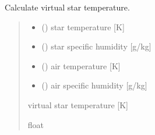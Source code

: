 \documentclass[letterpaper,10pt,english]{sphinxmanual}
\begin{document}

\begin{fulllineitems}
\label{\detokenize{users_guide:AirSeaFluxCode.flux_subs.get_tsrv}}
\pysigstartsignatures
\pysiglinewithargsret
{}
{\sphinxparamcomma {}\sphinxparamcomma {}\sphinxparamcomma {}}
{}
\pysigstopsignatures
\sphinxAtStartPar
Calculate virtual star temperature.
\begin{quote}\begin{description}
\begin{itemize}
\item {}
\sphinxAtStartPar
{} () \textendash{} star temperature {[}K{]}

\item {}
\sphinxAtStartPar
{} () \textendash{} star specific humidity {[}g/kg{]}

\item {}
\sphinxAtStartPar
{} () \textendash{} air temperature {[}K{]}

\item {}
\sphinxAtStartPar
{} () \textendash{} air specific humidity {[}g/kg{]}

\end{itemize}

\sphinxAtStartPar
{} \textendash{} virtual star temperature {[}K{]}

\sphinxAtStartPar
float

\end{description}\end{quote}

\end{fulllineitems}
\end{document}
